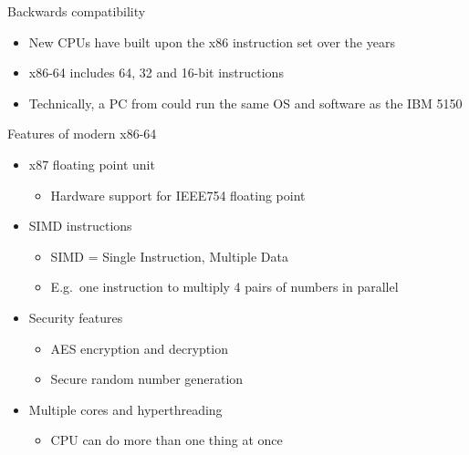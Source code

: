 \begin{frame}{Backwards compatibility}
    \begin{itemize}
        \pause\item New CPUs have built upon the x86 instruction set over the years
        \pause\item x86-64 includes 64, 32 and 16-bit instructions
        \pause\item Technically, a PC from \the\year{} could run the same OS and software as the IBM 5150
    \end{itemize}
\end{frame}

\begin{frame}{Features of modern x86-64}
    \begin{itemize}
        \pause\item x87 floating point unit
            \begin{itemize}
                \pause\item Hardware support for IEEE754 floating point
            \end{itemize}
        \pause\item SIMD instructions
            \begin{itemize}
                \pause\item SIMD = Single Instruction, Multiple Data
                \pause\item E.g.\ one instruction to multiply 4 pairs of numbers in parallel
            \end{itemize}
        \pause\item Security features
            \begin{itemize}
                \pause\item AES encryption and decryption
                \pause\item Secure random number generation
            \end{itemize}
        \pause\item Multiple cores and hyperthreading
            \begin{itemize}
                \pause\item CPU can do more than one thing at once
            \end{itemize}
    \end{itemize}
\end{frame}
